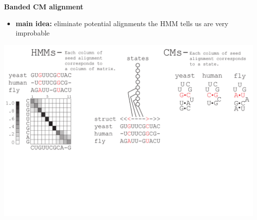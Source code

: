 \documentclass[landscape]{slides}
\begin{document}
\begin{slide}
\begin{center}
\large
\textbf{Banded CM alignment}
\end{center}
\medskip
\small
\begin{itemize}
\item
\textbf{main idea:} eliminate potential alignments the HMM tells us are very improbable
\end{itemize}
\begin{center}
\includegraphics[width=8in]{figs/post_hmm_to_cm_map2_layer6}
\end{center}
\vfill
\end{slide}
\end{document}
